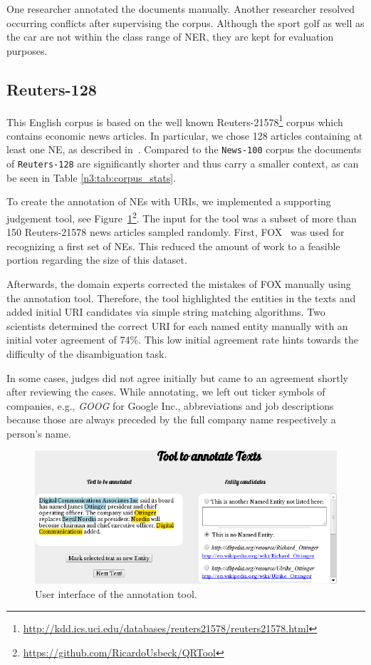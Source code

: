 One researcher annotated the documents manually.
Another researcher resolved occurring conflicts after supervising the corpus.
Although the sport golf as well as the car are not within the class range of NER, they are kept for evaluation purposes.

\subsection{Reuters-128}

This English corpus is based on the well known Reuters-21578\footnote{\url{http://kdd.ics.uci.edu/databases/reuters21578/reuters21578.html}} corpus which contains economic news articles.
In particular, we chose 128 articles containing at least one NE, as described in~\cite{agdistis_iswc}.
Compared to the \texttt{News-100} corpus the documents of \texttt{Reuters-128} are significantly shorter and thus carry a smaller context, as can be seen in Table \ref{n3:tab:corpus_stats}.

To create the annotation of NEs with URIs, we implemented a supporting judgement tool, see Figure~\ref{n3:fig:qrtool}\footnote{\url{https://github.com/RicardoUsbeck/QRTool}}. 
The input for the tool was a subset of more than 150 Reuters-21578 news articles sampled randomly.
First, FOX~\cite{FOX} was used for recognizing a first set of NEs. 
This reduced the amount of work to a feasible portion regarding the size of this dataset.

Afterwards, the domain experts corrected the  mistakes of FOX manually using the annotation tool.
Therefore, the tool highlighted the entities in the texts and added initial URI candidates via simple string matching algorithms.
Two scientists determined the correct URI for each named entity manually with an initial voter agreement of 74\%.
This low initial agreement rate hints towards the difficulty of the disambiguation task.

In some cases, judges did not agree initially but came to an agreement shortly after reviewing the cases.
While annotating, we left out ticker symbols of companies, e.g., \textit{GOOG} for Google Inc., abbreviations and job descriptions because those are always preceded by the full company name respectively a person's name.

\begin{figure}[htb!]
\centering
\includegraphics[width=\linewidth]{part_02/benchmarking/LREC_N3NIFNERNED/qrtool.png}
\caption{User interface of the annotation tool.}
\label{n3:fig:qrtool}
\end{figure}


